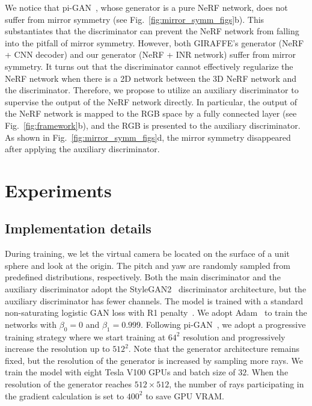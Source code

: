 \documentclass[10pt,twocolumn,letterpaper]{article}
\begin{document}
We notice that pi-GAN~\cite{chan2021piGAN}, whose generator is a pure NeRF network, does not suffer from mirror symmetry (see Fig.~\ref{fig:mirror_symm_figs}b). This substantiates that the discriminator can prevent the NeRF network from falling into the pitfall of mirror symmetry. However, both GIRAFFE's generator (NeRF + CNN decoder) and our generator (NeRF + INR network) suffer from mirror symmetry. It turns out that the discriminator cannot effectively regularize the NeRF network when there is a 2D network between the 3D NeRF network and the discriminator. Therefore, we propose to utilize an auxiliary discriminator to supervise the output of the NeRF network directly. In particular, the output of the NeRF network is mapped to the RGB space by a fully connected layer (see Fig.~\ref{fig:framework}b), and the RGB is presented to the auxiliary discriminator. As shown in Fig.~\ref{fig:mirror_symm_figs}d, the mirror symmetry disappeared after applying the auxiliary discriminator.









\section{Experiments}

\subsection{Implementation details}

During training, we let the virtual camera be located on the surface of a unit sphere and look at the origin. The pitch and yaw are randomly sampled from predefined distributions, respectively. Both the main discriminator and the auxiliary discriminator adopt the StyleGAN2~\cite{karras2019Analyzing} discriminator architecture, but the auxiliary discriminator has fewer channels. The model is trained with a standard non-saturating logistic GAN loss with R1 penalty~\cite{mescheder2018Which}. We adopt Adam~\cite{kingma2014Adam} to train the networks with $\beta_0=0$ and $\beta_1=0.999$. Following pi-GAN~\cite{chan2021piGAN}, we adopt a progressive training strategy where we start training at $64^2$ resolution and progressively increase the resolution up to $512^2$. Note that the generator architecture remains fixed, but the resolution of the generator is increased by sampling more rays. We train the model with eight Tesla V100 GPUs and batch size of $32$. When the resolution of the generator reaches $512\times512$, the number of rays participating in the gradient calculation is set to $400^2$ to save GPU VRAM.
\end{document}
